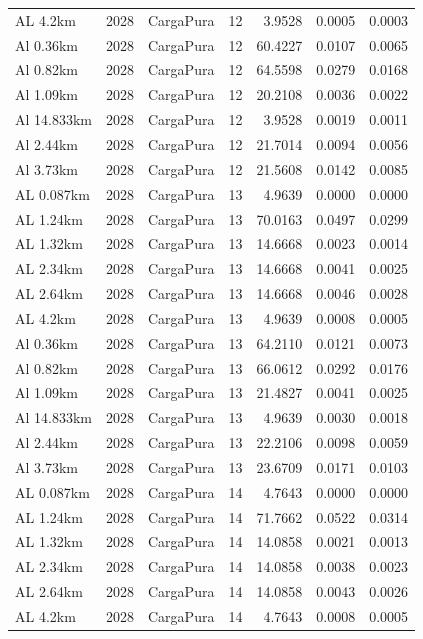 \documentclass[11pt,a4paper]{article}
\begin{document}
\begin{longtable}{llllrrr}
AL 4.2km & 2028 & CargaPura & 12 & 3.9528 & 0.0005 & 0.0003 \\
Al 0.36km & 2028 & CargaPura & 12 & 60.4227 & 0.0107 & 0.0065 \\
Al 0.82km & 2028 & CargaPura & 12 & 64.5598 & 0.0279 & 0.0168 \\
Al 1.09km & 2028 & CargaPura & 12 & 20.2108 & 0.0036 & 0.0022 \\
Al 14.833km & 2028 & CargaPura & 12 & 3.9528 & 0.0019 & 0.0011 \\
Al 2.44km & 2028 & CargaPura & 12 & 21.7014 & 0.0094 & 0.0056 \\
Al 3.73km & 2028 & CargaPura & 12 & 21.5608 & 0.0142 & 0.0085 \\
AL 0.087km & 2028 & CargaPura & 13 & 4.9639 & 0.0000 & 0.0000 \\
AL 1.24km & 2028 & CargaPura & 13 & 70.0163 & 0.0497 & 0.0299 \\
AL 1.32km & 2028 & CargaPura & 13 & 14.6668 & 0.0023 & 0.0014 \\
AL 2.34km & 2028 & CargaPura & 13 & 14.6668 & 0.0041 & 0.0025 \\
AL 2.64km & 2028 & CargaPura & 13 & 14.6668 & 0.0046 & 0.0028 \\
AL 4.2km & 2028 & CargaPura & 13 & 4.9639 & 0.0008 & 0.0005 \\
Al 0.36km & 2028 & CargaPura & 13 & 64.2110 & 0.0121 & 0.0073 \\
Al 0.82km & 2028 & CargaPura & 13 & 66.0612 & 0.0292 & 0.0176 \\
Al 1.09km & 2028 & CargaPura & 13 & 21.4827 & 0.0041 & 0.0025 \\
Al 14.833km & 2028 & CargaPura & 13 & 4.9639 & 0.0030 & 0.0018 \\
Al 2.44km & 2028 & CargaPura & 13 & 22.2106 & 0.0098 & 0.0059 \\
Al 3.73km & 2028 & CargaPura & 13 & 23.6709 & 0.0171 & 0.0103 \\
AL 0.087km & 2028 & CargaPura & 14 & 4.7643 & 0.0000 & 0.0000 \\
AL 1.24km & 2028 & CargaPura & 14 & 71.7662 & 0.0522 & 0.0314 \\
AL 1.32km & 2028 & CargaPura & 14 & 14.0858 & 0.0021 & 0.0013 \\
AL 2.34km & 2028 & CargaPura & 14 & 14.0858 & 0.0038 & 0.0023 \\
AL 2.64km & 2028 & CargaPura & 14 & 14.0858 & 0.0043 & 0.0026 \\
AL 4.2km & 2028 & CargaPura & 14 & 4.7643 & 0.0008 & 0.0005 \\

\end{longtable}
\end{document}
